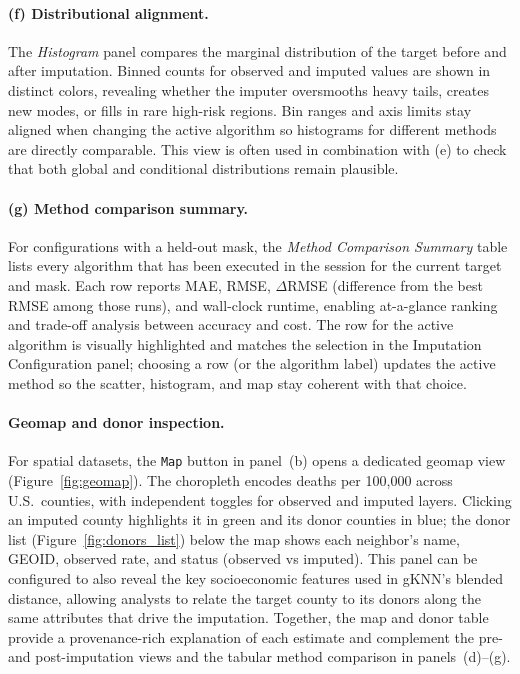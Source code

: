 \documentclass[review]{vgtc}
\begin{document}
\paragraph*{(f) Distributional alignment.}
The \emph{Histogram} panel compares the marginal distribution of the target before and after imputation. Binned counts for observed and imputed values are shown in distinct colors, revealing whether the imputer oversmooths heavy tails, creates new modes, or fills in rare high-risk regions. Bin ranges and axis limits stay aligned when changing the active algorithm so histograms for different methods are directly comparable. This view is often used in combination with (e) to check that both global and conditional distributions remain plausible.

\paragraph*{(g) Method comparison summary.}
For configurations with a held-out mask, the \emph{Method Comparison Summary} table lists every algorithm that has been executed in the session for the current target and mask. Each row reports MAE, RMSE, $\Delta$RMSE (difference from the best RMSE among those runs), and wall-clock runtime, enabling at-a-glance ranking and trade-off analysis between accuracy and cost. The row for the active algorithm is visually highlighted and matches the selection in the Imputation Configuration panel; choosing a row (or the algorithm label) updates the active method so the scatter, histogram, and map stay coherent with that choice.

\paragraph*{Geomap and donor inspection.}
For spatial datasets, the \texttt{Map} button in panel~(b) opens a dedicated geomap view (Figure~\ref{fig:geomap}). The choropleth encodes deaths per 100{,}000 across U.S.\ counties, with independent toggles for observed and imputed layers. Clicking an imputed county highlights it in green and its donor counties in blue; the donor list (Figure~\ref{fig:donors_list}) below the map shows each neighbor's name, GEOID, observed rate, and status (observed vs imputed). This panel can be configured to also reveal the key socioeconomic features used in gKNN's blended distance, allowing analysts to relate the target county to its donors along the same attributes that drive the imputation. Together, the map and donor table provide a provenance-rich explanation of each estimate and complement the pre- and post-imputation views and the tabular method comparison in panels~(d)--(g).
\end{document}
